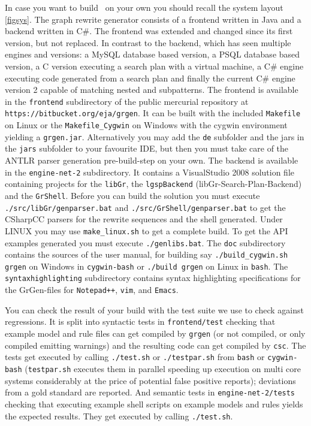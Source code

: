 In case you want to build \GrG~on your own you should recall the system layout \ref{figsys}. 
The graph rewrite generator consists of a frontend written in Java and a backend written in C\#.
The frontend was extended and changed since its first version, but not replaced.
In contrast to the backend, which has seen multiple engines and versions: a MySQL database based version, a PSQL database based version, 
a C version executing a search plan with a virtual machine, a C\# engine executing code generated from a search plan and finally the current C\# engine version 2 capable of matching nested and subpatterns.
The frontend is available in the \texttt{frontend} subdirectory of the public mercurial repository at \texttt{https://bitbucket.org/eja/grgen}.
It can be built with the included \texttt{Makefile} on Linux or the \texttt{Makefile\_Cygwin} on Windows with the cygwin environment yielding a \texttt{grgen.jar}. 
Alternatively you may add the \texttt{de} subfolder and the jars in the \texttt{jars} subfolder to your favourite IDE, but then you must take care of the ANTLR parser generation pre-build-step on your own. 
The backend is available in the \texttt{engine-net-2} subdirectory. 
It contains a VisualStudio 2008 solution file containing projects for the \texttt{libGr}, the \texttt{lgspBackend} (libGr-Search-Plan-Backend) and the \texttt{GrShell}.
Before you can build the solution you must execute \texttt{./src/libGr/genparser.bat} and \texttt{./src/Gr\-Shell/genparser.bat}
to get the CSharpCC parsers for the rewrite sequences and the shell generated.
Under LINUX you may use \texttt{make\_linux.sh} to get a complete build.
To get the API examples generated you must execute \texttt{./genlibs.bat}.
The \texttt{doc} subdirectory contains the sources of the user manual, for building say \texttt{./build\_cygwin.sh grgen} on Windows in \texttt{cygwin-bash} or \texttt{./build grgen} on Linux in \texttt{bash}.
The \texttt{syntaxhighlighting} subdirectory contains syntax highlighting specifications for the GrGen-files for \texttt{Notepad++}, \texttt{vim}, and \texttt{Emacs}.

You can check the result of your build with the test suite we use to check against regressions.
It is split into syntactic tests in \texttt{frontend/test} checking that example model and rule files can get compiled by \texttt{grgen} (or not compiled, or only compiled emitting warnings) and the resulting code can get compiled by \texttt{csc}.
The tests get executed by calling \texttt{./test.sh} or \texttt{./testpar.sh} from \texttt{bash} or \texttt{cygwin-bash} (\texttt{testpar.sh} executes them in parallel speeding up execution on multi core systems considerably at the price of potential false positive reports); deviations from a gold standard are reported.
And semantic tests in \texttt{engine-net-2/tests} checking that executing example shell scripts on example models and rules yields the expected results. 
They get executed by calling \texttt{./test.sh}.


